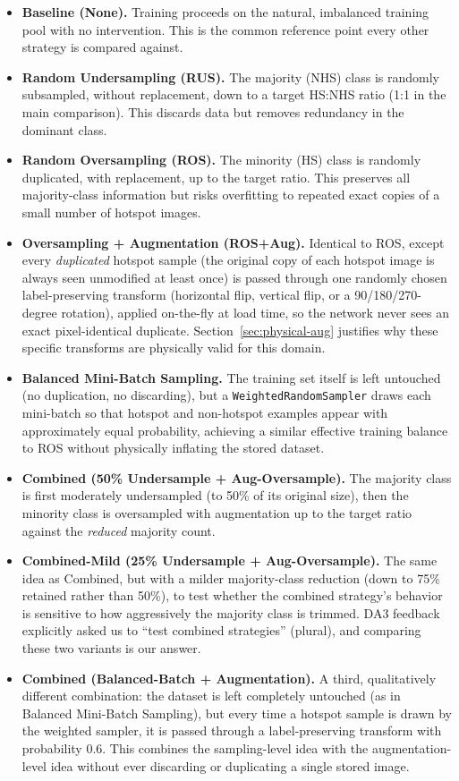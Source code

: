 \documentclass[conference]{IEEEtran}
\begin{document}
\begin{itemize}
  \item \textbf{Baseline (None).} Training proceeds on the natural,
  imbalanced training pool with no intervention. This is the common
  reference point every other strategy is compared against.
  \item \textbf{Random Undersampling (RUS).} The majority (NHS) class
  is randomly subsampled, without replacement, down to a target
  HS:NHS ratio (1:1 in the main comparison). This discards data but
  removes redundancy in the dominant class.
  \item \textbf{Random Oversampling (ROS).} The minority (HS) class is
  randomly duplicated, with replacement, up to the target ratio. This
  preserves all majority-class information but risks overfitting to
  repeated exact copies of a small number of hotspot images.
  \item \textbf{Oversampling + Augmentation (ROS+Aug).} Identical to
  ROS, except every \emph{duplicated} hotspot sample (the original copy
  of each hotspot image is always seen unmodified at least once) is
  passed through one randomly chosen label-preserving transform
  (horizontal flip, vertical flip, or a 90/180/270-degree rotation),
  applied on-the-fly at load time, so the network never sees an exact
  pixel-identical duplicate. Section~\ref{sec:physical-aug} justifies
  why these specific transforms are physically valid for this domain.
  \item \textbf{Balanced Mini-Batch Sampling.} The training set itself
  is left untouched (no duplication, no discarding), but a
  \texttt{WeightedRandomSampler} draws each mini-batch so that hotspot
  and non-hotspot examples appear with approximately equal
  probability, achieving a similar effective training balance to ROS
  without physically inflating the stored dataset.
  \item \textbf{Combined (50\% Undersample + Aug-Oversample).} The
  majority class is first moderately undersampled (to 50\% of its
  original size), then the minority class is oversampled with
  augmentation up to the target ratio against the \emph{reduced}
  majority count.
  \item \textbf{Combined-Mild (25\% Undersample + Aug-Oversample).} The
  same idea as Combined, but with a milder majority-class reduction
  (down to 75\% retained rather than 50\%), to test whether the
  combined strategy's behavior is sensitive to how aggressively the
  majority class is trimmed. DA3 feedback explicitly asked us to
  ``test combined strategies'' (plural), and comparing these two
  variants is our answer.
  \item \textbf{Combined (Balanced-Batch + Augmentation).} A third,
  qualitatively different combination: the dataset is left completely
  untouched (as in Balanced Mini-Batch Sampling), but every time a
  hotspot sample is drawn by the weighted sampler, it is passed
  through a label-preserving transform with probability 0.6. This
  combines the sampling-level idea with the augmentation-level idea
  without ever discarding or duplicating a single stored image.
\end{itemize}
\end{document}
